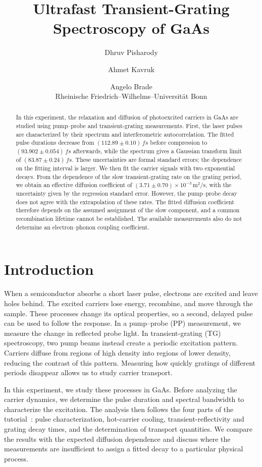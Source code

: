 \documentclass[11pt,a4paper]{article}
\title{Ultrafast Transient-Grating Spectroscopy of GaAs}
\author{Dhruv Pisharody \and Ahmet Kavruk \and Angelo Brade\\Rheinische Friedrich--Wilhelms--Universität Bonn}
\date{}
\begin{document}
\maketitle

\begin{abstract}
In this experiment, the relaxation and diffusion of photoexcited carriers in GaAs are studied using pump--probe and transient-grating measurements. First, the laser pulses are characterized by their spectrum and interferometric autocorrelation. The fitted pulse durations decrease from $(112.89\pm0.10)\,\si{fs}$ before compression to $(93.902\pm0.054)\,\si{fs}$ afterwards, while the spectrum gives a Gaussian transform limit of $(83.87\pm0.24)\,\si{fs}$. These uncertainties are formal standard errors; the dependence on the fitting interval is larger. We then fit the carrier signals with two exponential decays. From the dependence of the slow transient-grating rate on the grating period, we obtain an effective diffusion coefficient of $(3.71\pm0.70)\times10^{-3}\,\si{\metre\squared\per\second}$, with the uncertainty given by the regression standard error. However, the pump--probe decay does not agree with the extrapolation of these rates. The fitted diffusion coefficient therefore depends on the assumed assignment of the slow component, and a common recombination lifetime cannot be established. The available measurements also do not determine an electron--phonon coupling coefficient.
\end{abstract}

\tableofcontents
\clearpage

\section{Introduction}
When a semiconductor absorbs a short laser pulse, electrons are excited and leave holes behind. The excited carriers lose energy, recombine, and move through the sample. These processes change its optical properties, so a second, delayed pulse can be used to follow the response. In a pump--probe (PP) measurement, we measure the change in reflected probe light. In transient-grating (TG) spectroscopy, two pump beams instead create a periodic excitation pattern. Carriers diffuse from regions of high density into regions of lower density, reducing the contrast of this pattern. Measuring how quickly gratings of different periods disappear allows us to study carrier transport.

In this experiment, we study these processes in GaAs. Before analyzing the carrier dynamics, we determine the pulse duration and spectral bandwidth to characterize the excitation. The analysis then follows the four parts of the tutorial~\cite{tutorial}: pulse characterization, hot-carrier cooling, transient-reflectivity and grating decay times, and the determination of transport quantities. We compare the results with the expected diffusion dependence and discuss where the measurements are insufficient to assign a fitted decay to a particular physical process.
\end{document}
